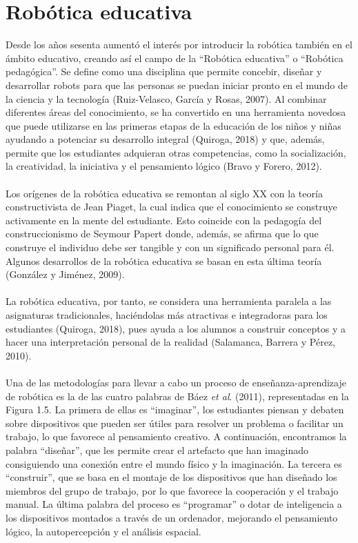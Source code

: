 \documentclass{report}
\begin{document}
\section{Robótica educativa}

Desde los años sesenta aumentó el interés por introducir la robótica también en el ámbito educativo, creando así el campo de la “Robótica educativa” o “Robótica pedagógica”. Se define como una disciplina que permite concebir, diseñar y desarrollar robots para que las personas se puedan iniciar pronto en el mundo de la ciencia y la tecnología (Ruiz-Velasco, García y Rosas, 2007). Al combinar diferentes áreas del conocimiento, se ha convertido en una herramienta novedosa que puede utilizarse en las primeras etapas de la educación de los niños y niñas ayudando a potenciar su desarrollo integral (Quiroga, 2018) y que, además, permite que los estudiantes adquieran otras competencias, como la socialización, la creatividad, la iniciativa y el pensamiento lógico (Bravo y Forero, 2012).
\\
\\
Los orígenes de la robótica educativa se remontan al siglo XX con la teoría constructivista de Jean Piaget, la cual indica que el conocimiento se construye activamente en la mente del estudiante. Esto coincide con la pedagogía del construccionismo de Seymour Papert donde, además, se afirma que lo que construye el individuo debe ser tangible y con un significado personal para él. Algunos desarrollos de la robótica educativa se basan en esta última teoría (González y Jiménez, 2009).
\\
\\
La robótica educativa, por tanto, se considera una herramienta paralela a las asignaturas tradicionales, haciéndolas más atractivas e integradoras para los estudiantes (Quiroga, 2018), pues ayuda a los alumnos a construir conceptos y a hacer una interpretación personal de la realidad (Salamanca, Barrera y Pérez, 2010).
\\
\\
Una de las metodologías para llevar a cabo un proceso de enseñanza-aprendizaje de robótica es la de las cuatro palabras de Báez \textit{et al}. (2011), representadas en la Figura 1.5. La primera de ellas es “imaginar”, los estudiantes piensan y debaten sobre dispositivos que pueden ser útiles para resolver un problema o facilitar un trabajo, lo que favorece al pensamiento creativo. A continuación, encontramos la palabra “diseñar”, que les permite crear el artefacto que han imaginado consiguiendo una conexión entre el mundo físico y la imaginación. La tercera es “construir”, que se basa en el montaje de los dispositivos que han diseñado los miembros del grupo de trabajo, por lo que favorece la cooperación y el trabajo manual. La última palabra del proceso es “programar” o dotar de inteligencia a los dispositivos montados a través de un ordenador, mejorando el pensamiento lógico, la autopercepción y el análisis espacial.
\end{document}
